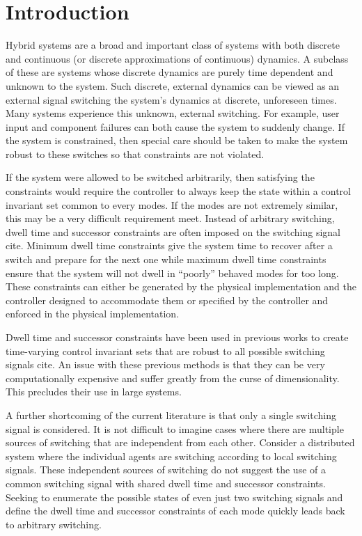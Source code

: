 \section{Introduction}
Hybrid systems are a broad and important class of systems with both discrete and continuous (or discrete approximations of continuous) dynamics. A subclass of these are systems whose discrete dynamics are purely time dependent and unknown to the system. Such discrete, external dynamics can be viewed as an external signal switching the system's dynamics at discrete, unforeseen times. Many systems experience this unknown, external switching. For example, user input and component failures can both cause the system to suddenly change. If the system is constrained, then special care should be taken to make the system robust to these switches so that constraints are not violated. 

If the system were allowed to be switched arbitrarily, then satisfying the constraints would require the controller to always keep the state within a control invariant set common to every modes. If the modes are not extremely similar, this may be a very difficult requirement meet. Instead of arbitrary switching, dwell time and successor constraints are often imposed on the switching signal \alert{cite}. Minimum dwell time constraints give the system time to recover after a switch and prepare for the next one while maximum dwell time constraints ensure that the system will not dwell in ``poorly'' behaved modes for too long. These constraints can either be generated by the physical implementation and the controller designed to accommodate them or specified by the controller and enforced in the physical implementation.

Dwell time and successor constraints have been used in previous works to create time-varying control invariant sets that are robust to all possible switching signals \alert{cite}. An issue with these previous methods is that they can be very computationally expensive and suffer greatly from the curse of dimensionality. This precludes their use in large systems. 

A further shortcoming of the current literature is that only a single switching signal is considered. It is not difficult to imagine cases where there are multiple sources of switching that are independent from each other. Consider a distributed system where the individual agents are switching according to local switching signals. These independent sources of switching do not suggest the use of a common switching signal with shared dwell time and successor constraints. Seeking to enumerate the possible states of even just two switching signals and define the dwell time and successor constraints of each mode quickly leads back to arbitrary switching.

